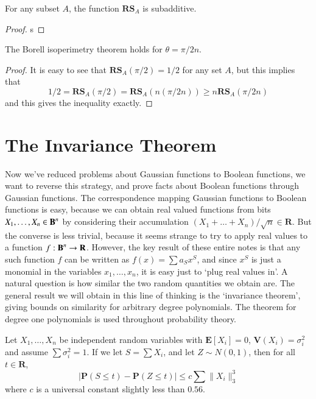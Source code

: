 \begin{lemma}
    For any subset $A$, the function $\mathbf{RS}_A$ is subadditive.
\end{lemma}
\begin{proof}
    s
\end{proof}

\begin{corollary}
    The Borell isoperimetry theorem holds for $\theta = \pi/2n$.
\end{corollary}
\begin{proof}
    It is easy to see that $\mathbf{RS}_A(\pi/2) = 1/2$ for any set $A$, but this implies that
    \[ 1/2 = \mathbf{RS}_A(\pi/2) = \mathbf{RS}_A(n (\pi/2n)) \geq n \mathbf{RS}_A(\pi/2n) \]
    and this gives the inequality exactly.
\end{proof}

\section{The Invariance Theorem}

Now we've reduced problems about Gaussian functions to Boolean functions, we want to reverse this strategy, and prove facts about Boolean functions through Gaussian functions. The correspondence mapping Gaussian functions to Boolean functions is easy, because we can obtain real valued functions from bits $X_1, \dots, X_n \in \operatorname{\mathbf{B}}^n$ by considering their accumulation $(X_1 + \dots + X_n)/\sqrt{n} \in \mathbf{R}$. But the converse is less trivial, because it seems strange to try to apply real values to a function $f: \operatorname{\mathbf{B}}^n \to \mathbf{R}$. However, the key result of these entire notes is that any such function $f$ can be written as $f(x) = \sum a_S x^S$, and since $x^S$ is just a monomial in the variables $x_1, \dots, x_n$, it is easy just to `plug real values in'. A natural question is how similar the two random quantities we obtain are. The general result we will obtain in this line of thinking is the `invariance theorem', giving bounds on similarity for arbitrary degree polynomials. The theorem for degree one polynomials is used throughout probability theory.

\begin{theorem}
    Let $X_1, \dots, X_n$ be independent random variables with $\mathbf{E}[X_i] = 0$, $\mathbf{V}(X_i) = \sigma_i^2$ and assume $\sum \sigma_i^2 = 1$. If we let $S = \sum X_i$, and let $Z \sim N(0,1)$, then for all $t \in \mathbf{R}$,
    \[ \left| \mathbf{P}(S \leq t) - \mathbf{P}(Z \leq t) \right| \leq c \sum \| X_i \|_3^3 \]
    where $c$ is a universal constant slightly less than $0.56$.
\end{theorem}

